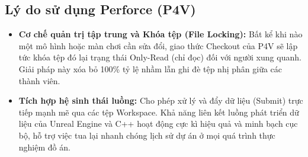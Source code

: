 \documentclass[../DoAn.tex]{subfiles}
\begin{document}
\subsection{Lý do sử dụng Perforce (P4V)}
\begin{itemize}
    \item \textbf{Cơ chế quản trị tập trung và Khóa tệp (File Locking):} Bất kể khi nào một mô hình hoặc màn chơi cần sửa đổi, giao thức Checkout của P4V sẽ lập tức khóa tệp đó lại trạng thái Only-Read (chỉ đọc) đối với người xung quanh. Giải pháp này xóa bỏ 100\% tỷ lệ nhầm lẫn ghi đè tệp nhị phân giữa các thành viên.
    \item \textbf{Tích hợp hệ sinh thái luồng:} Cho phép xử lý và đẩy dữ liệu (Submit) trực tiếp mạnh mẽ qua các tệp Workspace. Khả năng liên kết luồng phát triển dữ liệu của Unreal Engine và C++ hoạt động cực kì hiệu quả và minh bạch cục bộ, hỗ trợ việc tua lại nhanh chóng lịch sử dự án ở mọi quá trình thực nghiệm đồ án.
\end{itemize}
\end{document}
